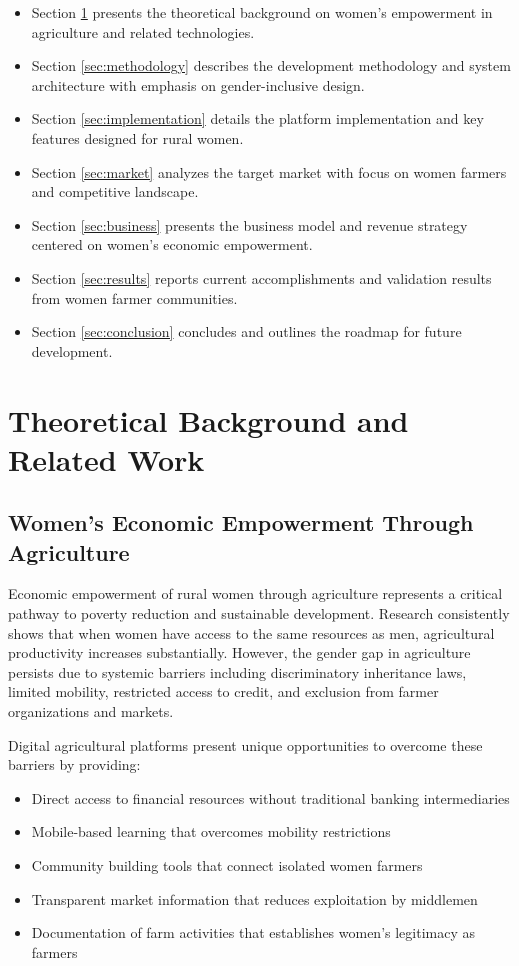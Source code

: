 \documentclass[9pt,twocolumn,twoside]{article}
\begin{document}
\begin{itemize}
  \item Section \ref{sec:theory} presents the theoretical background on women's empowerment in agriculture and related technologies.
  \item Section \ref{sec:methodology} describes the development methodology and system architecture with emphasis on gender-inclusive design.
  \item Section \ref{sec:implementation} details the platform implementation and key features designed for rural women.
  \item Section \ref{sec:market} analyzes the target market with focus on women farmers and competitive landscape.
  \item Section \ref{sec:business} presents the business model and revenue strategy centered on women's economic empowerment.
  \item Section \ref{sec:results} reports current accomplishments and validation results from women farmer communities.
  \item Section \ref{sec:conclusion} concludes and outlines the roadmap for future development.
\end{itemize}

\section{Theoretical Background and Related Work} \label{sec:theory}

\subsection{Women's Economic Empowerment Through Agriculture}

Economic empowerment of rural women through agriculture represents a critical pathway to poverty reduction and sustainable development. Research consistently shows that when women have access to the same resources as men, agricultural productivity increases substantially. However, the gender gap in agriculture persists due to systemic barriers including discriminatory inheritance laws, limited mobility, restricted access to credit, and exclusion from farmer organizations and markets.

Digital agricultural platforms present unique opportunities to overcome these barriers by providing:
\begin{itemize}
\item Direct access to financial resources without traditional banking intermediaries
\item Mobile-based learning that overcomes mobility restrictions
\item Community building tools that connect isolated women farmers
\item Transparent market information that reduces exploitation by middlemen
\item Documentation of farm activities that establishes women's legitimacy as farmers
\end{itemize}
\end{document}
